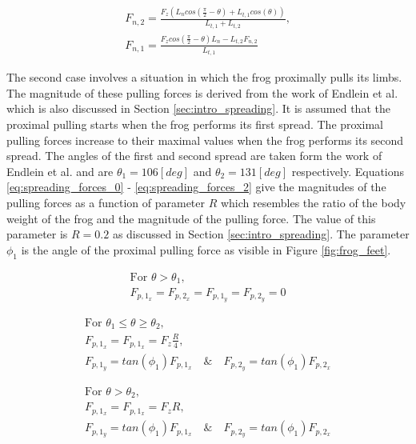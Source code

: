 \begin{gather}
     F_{n,2} = \frac{F_z (L_n cos(\frac{\pi}{2} - \theta) + L_{t,1} cos(\theta))}{L_{t,1} + L_{t,2}},\nonumber\\[1ex]
     F_{n,1} = \frac{F_{z} cos(\frac{\pi}{2} - \theta) L_{n} - L_{t,2} F_{n,2}}{L_{t,1}}
     \label{eq:static_equilibrium_normal}
\end{gather}

\qquad The second case involves a situation in which the frog proximally pulls its limbs. The magnitude of these pulling forces is derived from the work of Endlein et al. \cite{endlein2013sticking} which is also discussed in Section \ref{sec:intro_spreading}. It is assumed that the proximal pulling starts when the frog performs its first spread. The proximal pulling forces increase to their maximal values when the frog performs its second spread. The angles of the first and second spread are taken form the work of Endlein et al. and are $ \theta_1 = 106 [deg]$ and $\theta_2 = 131 [deg]$ respectively. Equations \ref{eq:spreading_forces_0} - \ref{eq:spreading_forces_2} give the magnitudes of the pulling forces as a function of parameter $R$ which resembles the ratio of the body weight of the frog and the magnitude of the pulling force. The value of this parameter is $R = 0.2$ as discussed in Section \ref{sec:intro_spreading}. The parameter $\phi_1$ is the angle of the proximal pulling force as visible in Figure \ref{fig:frog_feet}. 

\begin{gather}
     \text{For } \theta > \theta_{1},\nonumber\\[1ex]
     F_{p,1_x} = F_{p,2_x} = F_{p,1_y} = F_{p,2_y} = 0
     \label{eq:spreading_forces_0}
\end{gather}

\begin{gather}
     \text{For } \theta_{1} \leq \theta \geq \theta_2,\nonumber\\[1ex]
     F_{p,1_x} = F_{p,1_x} = F_z \frac{R}{4},\nonumber\\[1ex]
     F_{p,1_y} = tan(\phi_1)  F_{p,1_x} \quad \text{\&} \quad F_{p,2_y} = tan(\phi_1)  F_{p,2_x}
     \label{eq:spreading_forces_1}
\end{gather}

\begin{gather}
     \text{For } \theta > \theta_2,\nonumber\\[1ex]
     F_{p,1_x} = F_{p,1_x} = F_z R,\nonumber\\[1ex]
     F_{p,1_y} = tan(\phi_1)  F_{p,1_x} \quad \text{\&} \quad F_{p,2_y} = tan(\phi_1)  F_{p,2_x}
     \label{eq:spreading_forces_2}
\end{gather}

